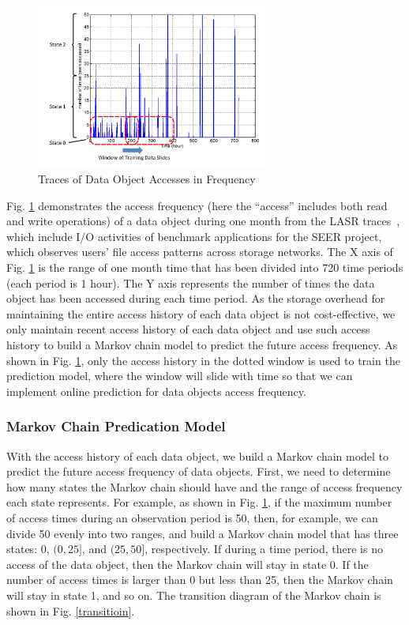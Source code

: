 \begin{figure}[!t]
\centering
\includegraphics[width=3.0in]{./trace.pdf}
\caption{Traces of Data Object Accesses in Frequency}
\vspace{-0.25in}
\label{trace}
\end{figure}


Fig. \ref{trace} demonstrates the access frequency (here the ``access'' includes both read and write operations) of a data object during one month from the LASR traces~\cite{tracedata2}, which include I/O activities of benchmark applications for the SEER project, which observes users' file access patterns across storage networks. The X axis of Fig. \ref{trace} is the range of one month time that has been divided into 720 time periods (each period is 1 hour). The Y axis represents the number of times the data object has been accessed during each time period. As the storage overhead for maintaining the entire access history of each data object is not cost-effective, we only maintain recent access history of each data object and use such access history to build a Markov chain model to predict the future access frequency. As shown in Fig. \ref{trace}, only the access history in the dotted window is used to train the prediction model, where the window will slide with time so that we can implement online prediction for data objects access frequency.

\subsubsection{Markov Chain Predication Model}

With the access history of each data object, we build a Markov chain model to predict the future access frequency of data objects. First, we need to determine how many states the Markov chain should have and the range of access frequency each state represents. For example, as shown in Fig. \ref{trace}, if the maximum number of access times during an observation period is 50, then, for example, we can divide 50 evenly into two ranges, and build a Markov chain model that has three states: $0$, $(0,25]$, and $(25,50]$, respectively. If during a time period, there is no access of the data object, then the Markov chain will stay in state 0. If the number of access times is larger than 0 but less than 25, then the Markov chain will stay in state 1, and so on. The transition diagram of the Markov chain is shown in Fig. \ref{transitioin}.

